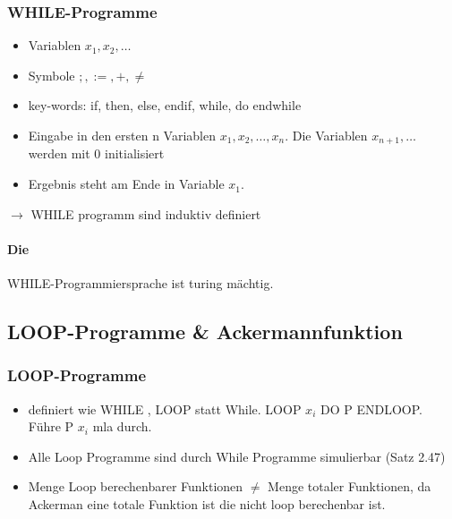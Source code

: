 \documentclass[a4paper, 10pt]{article}
\theoremstyle{definition}
\begin{document}
\subsubsection{WHILE-Programme}
\begin{itemize}
    \item Variablen $x_1,x_2,\dots$
    \item Symbole $;,:=,+,\neq$
    \item key-words: if, then, else, endif, while, do endwhile
    \item Eingabe in den ersten n Variablen $x_1,x_2,\dots,x_n$. Die Variablen $x_{n+1},\dots$ werden mit 0 initialisiert
    \item Ergebnis steht am Ende in Variable $x_1$.
    
\end{itemize}
$\to$ WHILE programm sind induktiv definiert
\paragraph{Die} WHILE-Programmiersprache ist turing mächtig.
\subsection{LOOP-Programme \& Ackermannfunktion}
\subsubsection{LOOP-Programme}
\begin{itemize}
    \item definiert wie WHILE , LOOP statt While. LOOP $x_i$ DO P ENDLOOP. Führe P $x_i$ mla durch.
    \item Alle Loop Programme sind durch While Programme simulierbar (Satz 2.47)
    \item Menge Loop berechenbarer Funktionen $\neq$ Menge totaler Funktionen, da Ackerman eine totale Funktion ist die nicht loop berechenbar ist.
\end{itemize}
\end{document}
